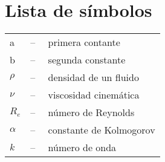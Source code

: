 \chapter*{\hfill{\centering Lista de símbolos}\hfill}
\vspace{0.5cm}
\normalsize

\begin{tabular}{ll}
a           &--$\quad$ primera contante \\
b           &--$\quad$ segunda constante \\
$\rho$      &--$\quad$ densidad de un fluido\\
$\nu$       &--$\quad$ viscosidad cinemática\\
$R_{e}$     &--$\quad$ número de Reynolds\\
$\alpha$    &--$\quad$ constante de Kolmogorov\\
$k$         &--$\quad$ número de onda\\
\end{tabular}